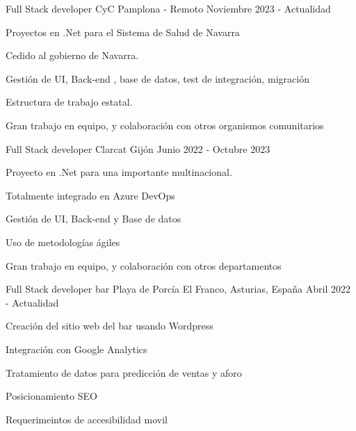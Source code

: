 

\begin{cventries}
    \cventry
    {Full Stack developer} %
    {CyC} %
    {Pamplona - Remoto} %
    {Noviembre 2023 - Actualidad} %
    {
        \begin{cvitems} %
            \item {Proyectos en .Net para el Sistema de Salud de Navarra}
            \item {Cedido al gobierno de Navarra.}
            \item {Gestión de UI, Back-end , base de datos, test de integración, migración}
            \item {Estructura de trabajo estatal.}
            \item {Gran trabajo en equipo, y colaboración con otros organismos comunitarios}
        \end{cvitems}
    }
    \cventry
    {Full Stack developer} %
    {Clarcat} %
    {Gijón} %
    {Junio 2022 - Octubre 2023} %
    {
        \begin{cvitems} %
            \item {Proyecto en .Net para una importante multinacional.}
            \item {Totalmente integrado en Azure DevOps}
            \item {Gestión de UI, Back-end y Base de datos}
            \item {Uso de metodologías ágiles}
            \item {Gran trabajo en equipo, y colaboración con otros departamentos}
        \end{cvitems}
    }
    \cventry
    {Full Stack developer} %
    {bar Playa de Porcía} %
    {El Franco, Asturias, España} %
    {Abril 2022 - Actualidad} %
    {
        \begin{cvitems} %
            \item {Creación del sitio web del bar usando Wordpress}
            \item  {Integración con Google Analytics}
            \item {Tratamiento de datos para predicción de ventas y aforo}
            \item {Posicionamiento SEO}
            \item {Requerimeintos de accesibilidad movil}
        \end{cvitems}
    }


\end{cventries}

